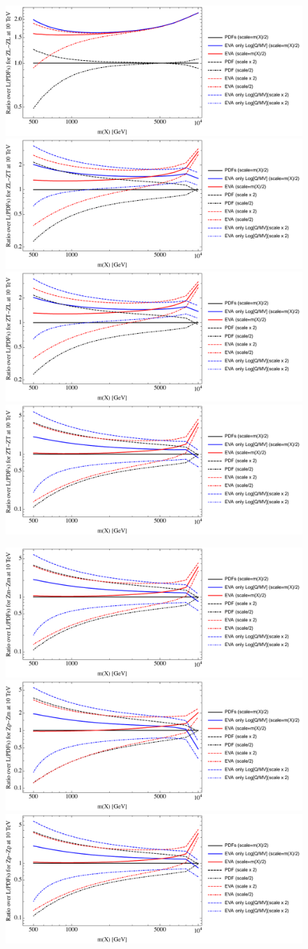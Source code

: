 \documentclass[a4paper,11pt]{article}
\begin{document}
\begin{figure}[ht]
\includegraphics[width=0.46\linewidth]{Notebooks/PlotLumi/10TeV/ratios/ZL-ZL.pdf}
\includegraphics[width=0.46\linewidth]{Notebooks/PlotLumi/10TeV/ratios/ZL-ZT.pdf}
\includegraphics[width=0.46\linewidth]{Notebooks/PlotLumi/10TeV/ratios/ZT-ZL.pdf}
\includegraphics[width=0.46\linewidth]{Notebooks/PlotLumi/10TeV/ratios/ZT-ZT.pdf}
\end{figure}

\begin{figure}[ht]
\includegraphics[width=0.46\linewidth]{Notebooks/PlotLumi/10TeV/ratios/Zm-Zm.pdf}
\includegraphics[width=0.46\linewidth]{Notebooks/PlotLumi/10TeV/ratios/Zp-Zm.pdf}
\includegraphics[width=0.46\linewidth]{Notebooks/PlotLumi/10TeV/ratios/Zp-Zp.pdf}
\end{figure}
\end{document}

